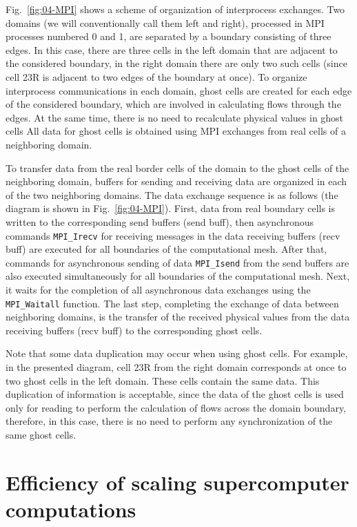 \documentclass[
11pt,%
tightenlines,%
twoside,%
onecolumn,%
nofloats,%
nobibnotes,%
nofootinbib,%
superscriptaddress,%
noshowpacs,%
centertags]%
{revtex4}
\begin{document}
Fig.~\ref{fig:04-MPI} shows a scheme of organization of interprocess exchanges.
Two domains (we will conventionally call them left and right), processed in MPI processes numbered 0 and 1, are separated by a boundary consisting of three edges.
In this case, there are three cells in the left domain that are adjacent to the considered boundary, in the right domain there are only two such cells (since cell 23R is adjacent to two edges of the boundary at once).
To organize interprocess communications in each domain, ghost cells are created for each edge of the considered boundary, which are involved in calculating flows through the edges.
At the same time, there is no need to recalculate physical values in ghost cells
All data for ghost cells is obtained using MPI exchanges from real cells of a neighboring domain.

To transfer data from the real border cells of the domain to the ghost cells of the neighboring domain, buffers for sending and receiving data are organized in each of the two neighboring domains.
The data exchange sequence is as follows (the diagram is shown in Fig.~\ref{fig:04-MPI}).
First, data from real boundary cells is written to the corresponding send buffers (send buff), then asynchronous commands \texttt{MPI\_Irecv} for receiving messages in the data receiving buffers (recv buff) are executed for all boundaries of the computational mesh.
After that, commands for asynchronous sending of data \texttt{MPI\_Isend} from the send buffers are also executed simultaneously for all boundaries of the computational mesh.
Next, it waits for the completion of all asynchronous data exchanges using the \texttt{MPI\_Waitall} function.
The last step, completing the exchange of data between neighboring domains, is the transfer of the received physical values from the data receiving buffers (recv buff) to the corresponding ghost cells.

Note that some data duplication may occur when using ghost cells.
For example, in the presented diagram, cell 23R from the right domain corresponds at once to two ghost cells in the left domain.
These cells contain the same data.
This duplication of information is acceptable, since the data of the ghost cells is used only for reading to perform the calculation of flows across the domain boundary, therefore, in this case, there is no need to perform any synchronization of the same ghost cells.

\section{Efficiency of scaling supercomputer computations}
\end{document}
